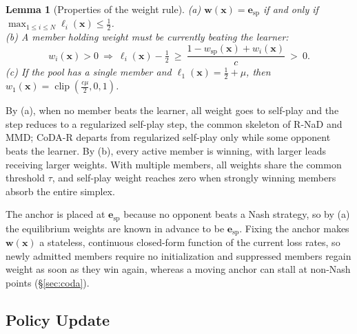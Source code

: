 \documentclass{article}
\theoremstyle{plain}
\newtheorem{lemma}[theorem]{Lemma}
\theoremstyle{remark}
\newcommand{\bx}{{\bm{x}}}
\newcommand{\bw}{{\bm{w}}}
\newcommand{\be}{{\bm{e}}}
\newcommand{\esp}{\be_{\mathrm{sp}}}
\newcommand{\wsp}{w_{\mathrm{sp}}}
\newcommand{\codar}{CoDA-R}
\begin{document}
\begin{lemma}[Properties of the weight rule]
\label{lem:dual}
(a) $\bw(\bx)=\esp$ if and only if $\max_{1\le i\le N}\ell_i(\bx)\le\tfrac12$.\\
(b) A member holding weight must be currently beating the learner:
\[
w_i(\bx)>0\ \Longrightarrow\ \ell_i(\bx)-\tfrac12\ \ge\ \frac{1-\wsp(\bx)+w_i(\bx)}{c}\ >\ 0 .
\]
(c) If the pool has a single member and $\ell_1(\bx)=\tfrac12+\mu$, then $w_1(\bx)=\operatorname{clip}(\tfrac{c\mu}{2},0,1)$.
\end{lemma}

By (a), when no member beats the learner, all weight goes to self-play and the step reduces to a regularized self-play step, the common skeleton of R-NaD and MMD; \codar{} departs from regularized self-play only while some opponent beats the learner. By (b), every active member is winning, with larger leads receiving larger weights. With multiple members, all weights share the common threshold $\tau$, and self-play weight reaches zero when strongly winning members absorb the entire simplex.

The anchor is placed at $\esp$ because no opponent beats a Nash strategy, so by (a) the equilibrium weights are known in advance to be $\esp$. Fixing the anchor makes $\bw(\bx)$ a stateless, continuous closed-form function of the current loss rates, so newly admitted members require no initialization and suppressed members regain weight as soon as they win again, whereas a moving anchor can stall at non-Nash points (\S\ref{sec:coda}).

\subsection{Policy Update}
\label{sec:primal}
\end{document}
